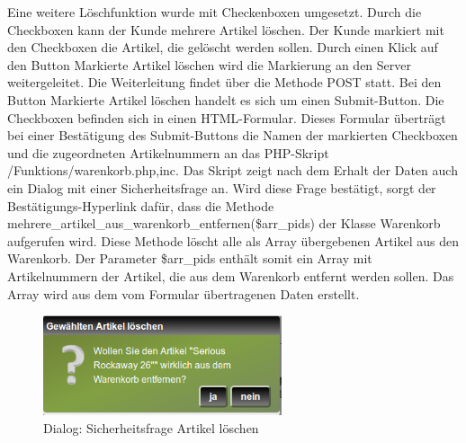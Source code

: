 Eine weitere Löschfunktion wurde mit Checkenboxen umgesetzt. Durch die Checkboxen kann der Kunde mehrere Artikel löschen. Der Kunde markiert mit den Checkboxen die Artikel, die gelöscht werden sollen. Durch einen Klick auf den Button \glqq Markierte Artikel löschen\grqq{} wird die Markierung an den Server weitergeleitet. Die Weiterleitung findet über die Methode \glqq POST\grqq{} statt. Bei den Button \glqq Markierte Artikel löschen\grqq{} handelt es sich um einen Submit-Button. Die Checkboxen befinden sich in einen HTML-Formular. Dieses Formular überträgt bei einer Bestätigung des Submit-Buttons die Namen  der markierten Checkboxen und die zugeordneten Artikelnummern an das PHP-Skript \glqq /Funktions/warenkorb.php,inc\grqq{}. Das Skript zeigt nach dem Erhalt der Daten auch ein Dialog mit einer Sicherheitsfrage an. Wird diese Frage bestätigt, sorgt der Bestätigungs-Hyperlink dafür, dass die Methode \glqq mehrere\_artikel\_aus\_warenkorb\_entfernen(\$arr\_pids)\grqq{} der Klasse \glqq Warenkorb\grqq{} aufgerufen wird. Diese Methode löscht alle als Array übergebenen Artikel aus den Warenkorb. Der Parameter \glqq \$arr\_pids\grqq{} enthält somit ein Array mit Artikelnummern der Artikel, die aus dem Warenkorb entfernt werden sollen. Das Array wird aus dem vom Formular übertragenen Daten erstellt.

\begin{figure}[H]
	\begin{center}
			\includegraphics[width=70mm]{Bilder/sicherheitsfrage_artikel_loeschen.png}
	\end{center}
	\caption{Dialog: Sicherheitsfrage Artikel löschen}
\end{figure}

